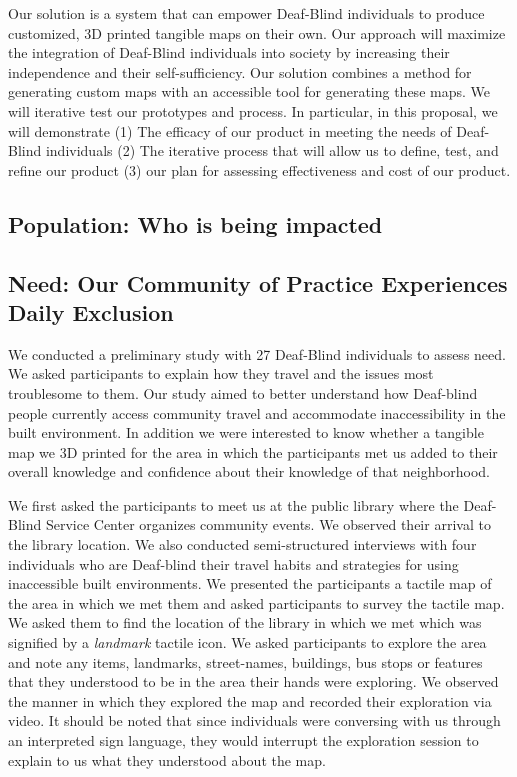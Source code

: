 Our solution is a system that can empower Deaf-Blind individuals to produce  customized, 3D printed tangible maps on their own. Our approach will maximize the integration of Deaf-Blind individuals into society by increasing their independence and their self-sufficiency. Our solution combines a method for generating custom maps with an accessible tool for generating these maps. We will iterative test our prototypes and process. In particular, in this proposal, we will demonstrate (1) The efficacy of our product in meeting the needs of Deaf-Blind individuals (2)  The iterative process that will allow us to define, test, and refine our product (3) our plan for assessing effectiveness and cost of our product. 

\subsection{Population: Who is being impacted}

\subsection{Need: Our Community of Practice Experiences Daily Exclusion}

We conducted a  preliminary study with 27 Deaf-Blind individuals to assess need. We asked participants to explain how they travel and the issues most troublesome to them. 
Our study aimed to better understand how Deaf-blind people currently access community travel and 
accommodate inaccessibility in the built environment. In addition we were interested to know whether a tangible map we 3D printed for the area in which the participants met us added to their overall knowledge and confidence about their knowledge of that neighborhood.

We first asked the participants to meet us at the public library where the Deaf-Blind Service Center organizes community events. 
We observed their arrival to the library location. We also conducted semi-structured interviews with four individuals who are Deaf-blind their travel habits and strategies for using inaccessible built environments. 
We presented the participants a tactile map of the area in which we met them and asked participants to survey the tactile map. We asked them to find the location of the library in which we met which was signified by a \textit{landmark} tactile icon. We asked participants to explore the area and note any items, landmarks, street-names, buildings, bus stops or features that they understood to be in the area their hands were exploring. We observed the manner in which they explored the map and recorded their exploration via video. It should be noted that since individuals were conversing with us through an interpreted sign language, they would interrupt the exploration session to explain to us what they understood about the map.

